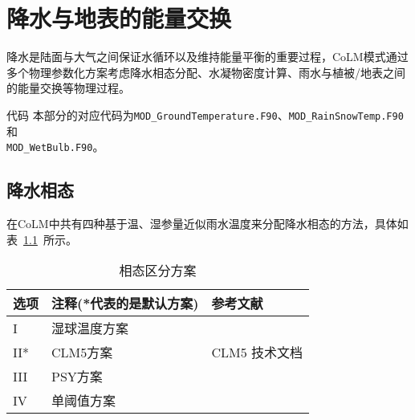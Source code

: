 \chapter{降水与地表的能量交换}
降水是陆面与大气之间保证水循环以及维持能量平衡的重要过程，CoLM模式通过多个物理参数化方案考虑降水相态分配、水凝物密度计算、雨水与植被/地表之间的能量交换等物理过程。

\begin{mymdframed}{代码}
  本部分的对应代码为\texttt{MOD\_GroundTemperature.F90}、\texttt{MOD\_RainSnowTemp.F90}和\\
  \texttt{MOD\_WetBulb.F90}。
\end{mymdframed}

\section{降水相态}\label{相态分配}
在CoLM中共有四种基于温、湿参量近似雨水温度来分配降水相态的方法，具体如表~\ref{tab:相态区分方案}~所示。

\begin{table}[]
  \caption{相态区分方案}
  \label{tab:相态区分方案}
  \begin{tabular}[h]{p{1cm}p{5cm}p{10cm}}
    \toprule
    选项 & 注释(*代表的是默认方案) & 参考文献                                   \\ \midrule
    I    & 湿球温度方案            & \citet{Wang-etal_19WetBulb}                \\
    II*  & CLM5方案                &  CLM5 技术文档 \\
    III  & PSY方案                 & \citet{harder2013estimating}               \\
    IV   & 单阈值方案              & \citet{us1956snow}                         \\ \bottomrule
  \end{tabular}
\end{table}

